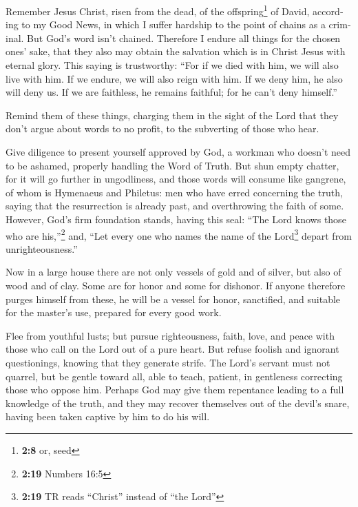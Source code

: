 \begin{paracol}{2}
\begin{otherlanguage}{english}
 Remember Jesus Christ, risen from the dead, of the
offspring\footnote{\textbf{2:8} or, seed} of David, according to my Good
News,  in which I suffer hardship to the point of chains
as a criminal. But God's word isn't chained.  Therefore I
endure all things for the chosen ones' sake, that they also may obtain
the salvation which is in Christ Jesus with eternal glory.
 This saying is trustworthy: ``For if we died with him,
we will also live with him.  If we endure, we will also
reign with him. If we deny him, he also will deny us.  If
we are faithless, he remains faithful; for he can't deny himself.''

 Remind them of these things, charging them in the sight
of the Lord that they don't argue about words to no profit, to the
subverting of those who hear.

 Give diligence to present yourself approved by God, a
workman who doesn't need to be ashamed, properly handling the Word of
Truth.  But shun empty chatter, for it will go further in
ungodliness,  and those words will consume like gangrene,
of whom is Hymenaeus and Philetus:  men who have erred
concerning the truth, saying that the resurrection is already past, and
overthrowing the faith of some.  However, God's firm
foundation stands, having this seal: ``The Lord knows those who are
his,''\footnote{\textbf{2:19} Numbers 16:5} and, ``Let every one who
names the name of the Lord\footnote{\textbf{2:19} TR reads ``Christ''
  instead of ``the Lord''} depart from unrighteousness.''

 Now in a large house there are not only vessels of gold
and of silver, but also of wood and of clay. Some are for honor and some
for dishonor.  If anyone therefore purges himself from
these, he will be a vessel for honor, sanctified, and suitable for the
master's use, prepared for every good work.

 Flee from youthful lusts; but pursue righteousness,
faith, love, and peace with those who call on the Lord out of a pure
heart.  But refuse foolish and ignorant questionings,
knowing that they generate strife.  The Lord's servant
must not quarrel, but be gentle toward all, able to teach, patient,
 in gentleness correcting those who oppose him. Perhaps
God may give them repentance leading to a full knowledge of the truth,
 and they may recover themselves out of the devil's
snare, having been taken captive by him to do his will.


\end{otherlanguage}
\end{paracol}
